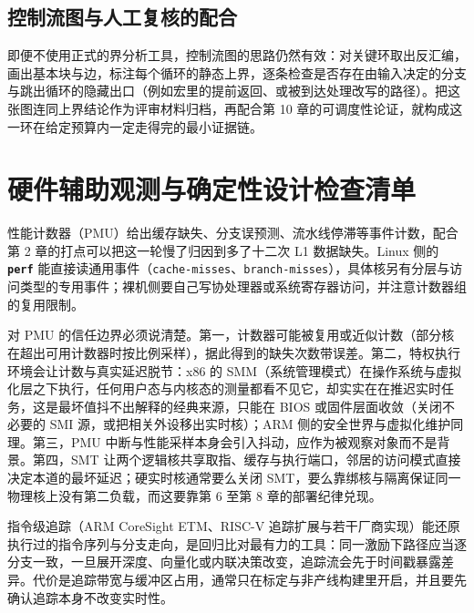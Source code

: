 \documentclass[12pt,a4paper,fontset=fandol]{ctexbook}
\newcommand{\Tp}[1]{\texttt{#1}}
\newcommand{\Lib}[1]{\textbf{\texttt{#1}}}
\begin{document}
\subsection{控制流图与人工复核的配合}

即便不使用正式的界分析工具，控制流图的思路仍然有效：对关键环取出反汇编，画出基本块与边，标注每个循环的静态上界，逐条检查是否存在由输入决定的分支与跳出循环的隐藏出口（例如宏里的提前返回、或被到达处理改写的路径）。把这张图连同上界结论作为评审材料归档，再配合第 10 章的可调度性论证，就构成这一环在给定预算内一定走得完的最小证据链。

\section{硬件辅助观测与确定性设计检查清单}
\label{sec:ch13-hw-aux-checklist}

性能计数器（PMU）给出缓存缺失、分支误预测、流水线停滞等事件计数，配合第 2 章的打点可以把这一轮慢了归因到多了十二次 L1 数据缺失。Linux 侧的 \Lib{perf} 能直接读通用事件（\Tp{cache-misses}、\Tp{branch-misses}），具体核另有分层与访问类型的专用事件；裸机侧要自己写协处理器或系统寄存器访问，并注意计数器组的复用限制。

对 PMU 的信任边界必须说清楚。第一，计数器可能被复用或近似计数（部分核在超出可用计数器时按比例采样），据此得到的缺失次数带误差。第二，特权执行环境会让计数与真实延迟脱节：x86 的 SMM（系统管理模式）在操作系统与虚拟化层之下执行，任何用户态与内核态的测量都看不见它，却实实在在推迟实时任务，这是最坏值抖不出解释的经典来源，只能在 BIOS 或固件层面收敛（关闭不必要的 SMI 源，或把相关外设移出实时核）；ARM 侧的安全世界与虚拟化维护同理。第三，PMU 中断与性能采样本身会引入抖动，应作为被观察对象而不是背景。第四，SMT 让两个逻辑核共享取指、缓存与执行端口，邻居的访问模式直接决定本道的最坏延迟；硬实时核通常要么关闭 SMT，要么靠绑核与隔离保证同一物理核上没有第二负载，而这要靠第 6 至第 8 章的部署纪律兑现。

指令级追踪（ARM CoreSight ETM、RISC-V 追踪扩展与若干厂商实现）能还原执行过的指令序列与分支走向，是回归比对最有力的工具：同一激励下路径应当逐分支一致，一旦展开深度、向量化或内联决策改变，追踪流会先于时间戳暴露差异。代价是追踪带宽与缓冲区占用，通常只在标定与非产线构建里开启，并且要先确认追踪本身不改变实时性。
\end{document}

